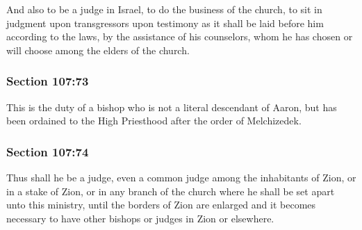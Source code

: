 		And also to be a judge in Israel, to do the business of the church, to sit in judgment upon transgressors upon testimony as it shall be laid before him according to the laws, by the assistance of his counselors, whom he has chosen or will choose among the elders of the church.


	\subsubsection{Section 107:73} %
		\label{DC107-73}

		This is the duty of a bishop who is not a literal descendant of Aaron, but has been ordained to the High Priesthood after the order of Melchizedek.


	\subsubsection{Section 107:74} %
		\label{DC107-74}

		Thus shall he be a judge, even a common judge among the inhabitants of Zion, or in a stake of Zion, or in any branch of the church where he shall be set apart unto this ministry, until the borders of Zion are enlarged and it becomes necessary to have other bishops or judges in Zion or elsewhere.


